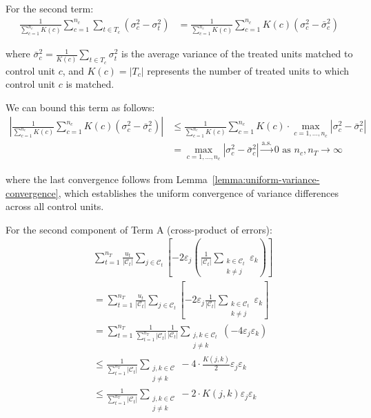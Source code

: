 \documentclass{mytemplate}
\begin{document}
For the second term:
\begin{align}
\frac{1}{\sum_{c=1}^{n_c} K(c)} \sum_{c=1}^{n_c} \sum_{t \in T_c}(\sigma_c^2-\sigma_t^2) &= \frac{1}{\sum_{c=1}^{n_c} K(c)} \sum_{c=1}^{n_c} K(c)(\sigma_c^2-\bar{\sigma}_c^2)
\end{align}

where $\bar{\sigma}_c^2 = \frac{1}{K(c)} \sum_{t \in T_c} \sigma_t^2$ is the average variance of the treated units matched to control unit $c$, and $K(c) = |T_c|$ represents the number of treated units to which control unit $c$ is matched.



We can bound this term as follows:
\begin{align}
\left|\frac{1}{\sum_{c=1}^{n_c} K(c)} \sum_{c=1}^{n_c} K(c)(\sigma_c^2-\bar{\sigma}_c^2)\right| &\leq \frac{1}{\sum_{c=1}^{n_c} K(c)} \sum_{c=1}^{n_c} K(c) \cdot \max_{c=1,\ldots,n_c}|\sigma_c^2-\bar{\sigma}_c^2|\\
&= \max_{c=1,\ldots,n_c}|\sigma_c^2-\bar{\sigma}_c^2| \xrightarrow{\text{a.s.}} 0 \text{ as } n_c, n_T \rightarrow \infty
\end{align}

where the last convergence follows from Lemma~\ref{lemma:uniform-variance-convergence}, which establishes the uniform convergence of variance differences across all control units.


For the second component of Term A (cross-product of errors):
\begin{align*}
& \sum_{t=1}^{n_T} \frac{u_t}{|\mathcal{C}_t|} \sum_{j \in \mathcal{C}_t}\left[-2 \varepsilon_j\left(\frac{1}{|\mathcal{C}_t|} \sum_{\substack{k \in \mathcal{C}_t \\ k \neq j}} \varepsilon_k\right)\right] \\
&= \sum_{t=1}^{n_T} \frac{u_t}{|\mathcal{C}_t|} \sum_{j \in \mathcal{C}_t}\left[-2 \varepsilon_j \frac{1}{|\mathcal{C}_t|} \sum_{\substack{k \in \mathcal{C}_t \\ k \neq j}} \varepsilon_k\right] \\
&= \sum_{t=1}^{n_T} \frac{1}{\sum_{t=1}^{n_T}|\mathcal{C}_t|} \frac{1}{|\mathcal{C}_t|} \sum_{\substack{j,k \in \mathcal{C}_t \\ j \neq k}}\left(-4 \varepsilon_j \varepsilon_k\right) \\
&\leq \frac{1}{\sum_{t=1}^{n_T}|\mathcal{C}_t|} \sum_{\substack{j,k \in \mathcal{C} \\ j \neq k}}-4 \cdot \frac{K(j,k)}{2} \varepsilon_j \varepsilon_k \\
&\leq \frac{1}{\sum_{t=1}^{n_T}|\mathcal{C}_t|} \sum_{\substack{j,k \in \mathcal{C} \\ j \neq k}}-2 \cdot K(j,k) \varepsilon_j \varepsilon_k
\end{align*}
\end{document}
